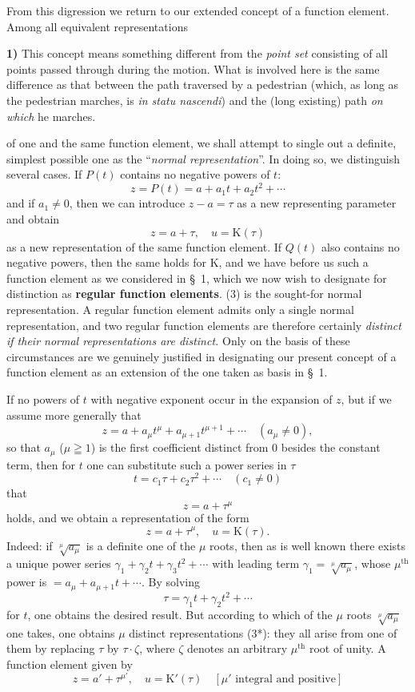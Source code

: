 \documentclass{article}
\begin{document}
From this digression we return to our extended concept of a function element. Among all equivalent representations

\textbf{1)} This concept means something different from the \emph{point set} consisting of all points passed through during the motion. What is involved here is the same difference as that between the path traversed by a pedestrian (which, as long as the pedestrian marches, is \emph{in statu nascendi}) and the (long existing) path \emph{on which} he marches.

of one and the same function element, we shall attempt to single out a definite, simplest possible one as the ``\emph{normal representation}''. In doing so, we distinguish several cases. If $P(t)$ contains no negative powers of $t$:
\[ z = P(t) = a + a_1 t + a_2 t^2 + \cdots \]
and if $a_1 \neq 0$, then we can introduce $z - a = \tau$ as a new representing parameter and obtain
\[ z = a + \tau, \quad u = \mathrm{K}(\tau) \tag{3} \]
as a new representation of the same function element. If $Q(t)$ also contains no negative powers, then the same holds for $\mathrm{K}$, and we have before us such a function element as we considered in §~1, which we now wish to designate for distinction as \textbf{regular function elements}. (3) is the sought-for normal representation. A regular function element admits only a single normal representation, and two regular function elements are therefore certainly \emph{distinct if their normal representations are distinct.} Only on the basis of these circumstances are we genuinely justified in designating our present concept of a function element as an extension of the one taken as basis in §~1.

If no powers of $t$ with negative exponent occur in the expansion of $z$, but if we assume more generally that
\[ z = a + a_\mu t^\mu + a_{\mu+1} t^{\mu+1} + \cdots \quad (a_\mu \neq 0), \]
so that $a_\mu$ ($\mu \geqq 1$) is the first coefficient distinct from $0$ besides the constant term, then for $t$ one can substitute such a power series in $\tau$
\[ t = c_1 \tau + c_2 \tau^2 + \cdots \quad (c_1 \neq 0) \]
that
\[ z = a + \tau^\mu \]
holds, and we obtain a representation of the form
\[ z = a + \tau^\mu, \quad u = \mathrm{K}(\tau). \tag{3*} \]
Indeed: if $\sqrt[\mu]{a_\mu}$ is a definite one of the $\mu$ roots, then as is well known there exists a unique power series $\gamma_1 + \gamma_2 t + \gamma_3 t^2 + \cdots$ with leading term $\gamma_1 = \sqrt[\mu]{a_\mu}$, whose $\mu^{\text{th}}$ power is $= a_\mu + a_{\mu+1} t + \cdots$. By solving
\[ \tau = \gamma_1 t + \gamma_2 t^2 + \cdots \]
for $t$, one obtains the desired result. But according to which of the $\mu$ roots $\sqrt[\mu]{a_\mu}$ one takes, one obtains $\mu$ distinct representations (3*): they all arise from one of them by replacing $\tau$ by $\tau \cdot \zeta$, where $\zeta$ denotes an arbitrary $\mu^{\text{th}}$ root of unity. A function element given by
\[ z = a' + \tau^{\mu'}, \quad u = \mathrm{K}'(\tau) \quad [\mu' \text{ integral and positive}] \tag{4} \]
\end{document}
